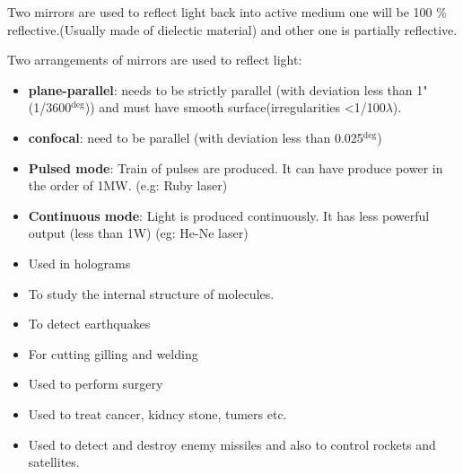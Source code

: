 \bigskip


\bigskip
{}

Two mirrors are used to reflect light back into active medium one will be 100 \% reflective.(Usually made of dielectic material) and other one is partially reflective.

Two arrangements of mirrors are used to reflect light:
\begin{itemize}
	\item \textbf{plane-parallel}: needs to be strictly parallel (with deviation less than 1" (1/3600$^{\deg}$)) and must have smooth surface(irregularities <1/100$\lambda$).
	\item \textbf{confocal}: need to be parallel (with deviation less than 0.025$^{\deg}$)
\end{itemize}



\begin{itemize}
	\item \textbf{Pulsed mode}: Train of pulses are produced. It can have produce power in the order of 1MW. (e.g: Ruby laser)
	\item \textbf{Continuous mode}: Light is produced continuously. It has less powerful output (less than 1W) (eg: He-Ne laser)
\end{itemize}


\begin{itemize}
	\item Used in holograms
	\item To study the internal structure of molecules.
	\item To detect earthquakes
	\item For cutting gilling and welding
	\item Used to perform surgery
	\item Used to treat cancer, kidncy stone, tumers etc.
	\item Used to detect and destroy enemy missiles and also to control rockets and satellites.
\end{itemize}
